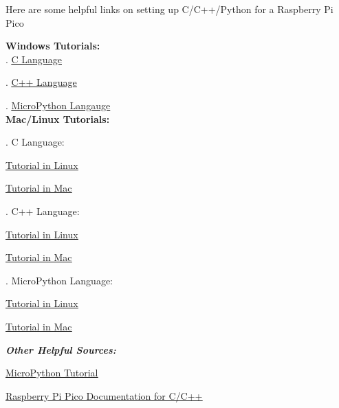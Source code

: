 \documentclass[a4paper,12pt]{article}
\begin{document}
Here are some helpful links on setting up C/C++/Python for a Raspberry Pi Pico

\textbf{Windows Tutorials:}\\
\indent{}. \underline{\href{https://www.raspberrypi.com/news/raspberry-pi-pico-windows-installer/}{C Language}}

\indent{}. \underline{\href{https://www.raspberrypi.com/news/raspberry-pi-pico-windows-installer/}{C++ Language}}

\indent{}. \underline{\href{https://how2electronics.com/raspberry-pi-pico-getting-started-tutorial-with-micropython/}{MicroPython Langauge}}\\

\textbf{Mac/Linux Tutorials:}

\indent{}. C Language:
\begin{description}
	\setlength{\itemindent}{3em}
	\item[$\bullet$] \underline{\href{https://www.electronicshub.org/program-raspberry-pi-pico-using-c/}{Tutorial in Linux}}
	\item[$\bullet$] \underline{\href{https://blog.smittytone.net/2021/02/02/program-raspberry-pi-pico-c-mac/}{Tutorial in Mac}}
\end{description}

\indent{}. C++ Language:
\begin{description}
	\setlength{\itemindent}{3em}
	\item[$\bullet$]\underline{\href{https://circuitdigest.com/microcontroller-projects/how-to-program-raspberry-pi-pico-using-c}{Tutorial in Linux}}
	\item[$\bullet$]\underline{\href{https://www.peterzimon.com/raspberry-pi-pico-mac-c-getting-started/}{Tutorial in Mac}}
\end{description}

\indent{}. MicroPython Language:
\begin{description}
	\setlength{\itemindent}{3em}
	\item[$\bullet$]\underline{\href{https://circuitdigest.com/microcontroller-projects/getting-started-with-raspberry-pi-pico-with-micropython}{Tutorial in Linux}}
	\item[$\bullet$]\underline{\href{https://desertbot.io/blog/raspberry-pi-pico-setup-mac}{Tutorial in Mac}}
\end{description}

\large
\emph{\textbf{Other Helpful Sources:}}
\normalsize
\begin{description}
	\setlength{\itemindent}{3em}
	\item[$\bullet$] \underline{\href{https://how2electronics.com/raspberry-pi-pico-getting-started-tutorial-with-micropython/}{MicroPython Tutorial}}
	\item[$\bullet$] \underline{\href{https://www.raspberrypi.com/documentation/microcontrollers/c_sdk.html}{Raspberry Pi Pico Documentation for C/C++}}
\end{description}
\end{document}
